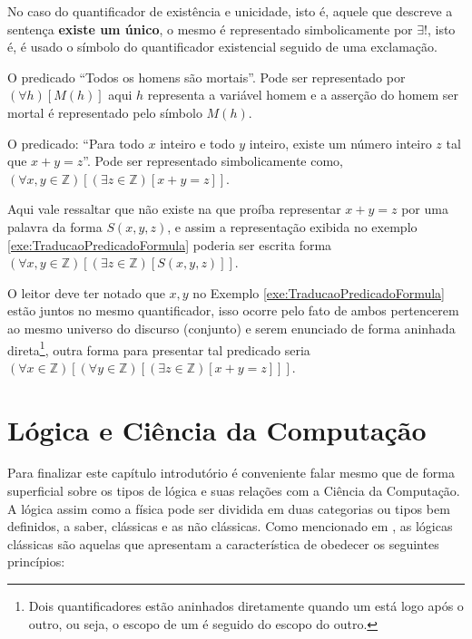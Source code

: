 \begin{remark}
	No caso do quantificador de existência e unicidade, isto é, aquele que descreve a sentença \textbf{existe um único}, o mesmo é representado simbolicamente por $\exists!$, isto é, é usado o símbolo do quantificador existencial seguido de uma exclamação.
\end{remark}


\begin{example}
	O predicado ``Todos os homens são mortais''. Pode ser representado por $(\forall h)[M(h)]$ aqui $h$ representa a variável homem e a asserção do homem ser mortal é representado pelo símbolo $M(h)$.
\end{example}

\begin{example}\label{exe:TraducaoPredicadoFormula}
	O predicado: ``Para todo $x$ inteiro e todo $y$ inteiro, existe um número inteiro $z$ tal que $x + y = z$''. Pode ser representado simbolicamente como, $(\forall x, y \in \mathbb{Z})[(\exists z \in \mathbb{Z})[x+ y = z]]$.
\end{example}

\begin{remark}
	Aqui vale ressaltar que não existe na que proíba representar $x + y = z$ por uma palavra da forma $S(x,y,z)$, e assim a representação exibida no exemplo \ref{exe:TraducaoPredicadoFormula} poderia ser escrita  forma $(\forall x, y \in \mathbb{Z})[(\exists z \in \mathbb{Z})[S(x, y, z)]]$.
\end{remark}


O leitor deve ter notado que $x, y$ no Exemplo \ref{exe:TraducaoPredicadoFormula} estão juntos no mesmo quantificador, isso ocorre pelo fato de ambos pertencerem ao mesmo universo do discurso (conjunto) e serem enunciado de forma aninhada direta\footnote{Dois quantificadores estão aninhados diretamente quando um está logo após o outro, ou seja, o escopo de um é seguido do escopo do outro.}, outra forma para presentar tal predicado seria $(\forall x \in \mathbb{Z})[(\forall y \in \mathbb{Z})[(\exists z \in \mathbb{Z})[x + y = z]]]$.



\section{Lógica e Ciência da Computação}\label{sec:Tipos-Logica-Aplicacoes}


Para finalizar este capítulo introdutório é conveniente falar mesmo que de forma superficial sobre os tipos de lógica e suas relações com a Ciência da Computação. A lógica assim como a física pode ser dividida em duas categorias ou tipos bem definidos, a saber, clássicas e as não
clássicas. Como mencionado em  \cite{BenjaV1, edgar2002}, as lógicas clássicas são aquelas que apresentam a característica de obedecer os seguintes princípios: 

